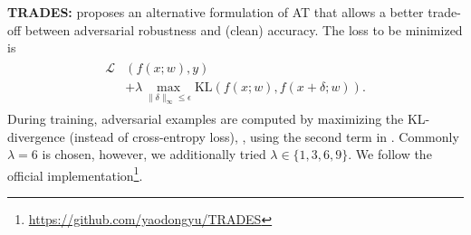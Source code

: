 \textbf{TRADES:} \cite{ZhangICML2019} proposes an alternative formulation of AT that allows a better trade-off between adversarial robustness and (clean) accuracy. The loss to be minimized is
\begin{align}
	\begin{split}
		\mathcal{L}&(f(x;w), y)\\
		&+ \lambda \max_{\|\delta\|_\infty \leq \epsilon} \text{KL}(f(x;w), f(x + \delta;w)).\label{eq:supp-methods-trades}
	\end{split}
\end{align}
During training, adversarial examples are computed by maximizing the KL-divergence (instead of cross-entropy loss), \ie, using the second term in . Commonly $\lambda = 6$ is chosen, however, we additionally tried $\lambda \in \{1, 3, 6, 9\}$. We follow the official implementation\footnote{\url{https://github.com/yaodongyu/TRADES}}.

